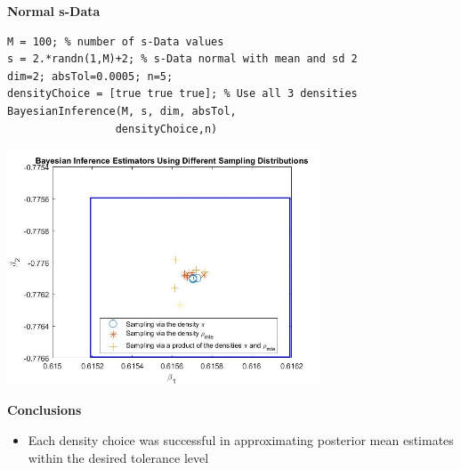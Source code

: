 \documentclass[final,mathserif]{beamer}
\newcommand{\blue}[1]{{\color{myblue}#1}}
\renewcommand{\blue}{\textcolor{blue!80!black}}
\begin{document}
\begin{frame}[fragile]
\begin{columns}[t]
\begin{column}{.31\linewidth}
\begin{block}{\Large \textbf{\blue {Normal s-Data}}}
\lstset{basicstyle=\small} 
\begin{lstlisting}      
M = 100; % number of s-Data values
s = 2.*randn(1,M)+2; % s-Data normal with mean and sd 2
dim=2; absTol=0.0005; n=5;
densityChoice = [true true true]; % Use all 3 densities
BayesianInference(M, s, dim, absTol, 
                 densityChoice,n)
\end{lstlisting}     

\vspace{.1in}

\begin{center}
\end{center}

\vspace{.1in}

\begin{center}
\includegraphics[width=0.7\textwidth]{NormalRandom}
\end{center} 

\end{block}

\bigskip

\begin{block}{\Large \textbf{\blue {Conclusions}}}

\vspace{.1in}

\begin{itemize}
\item Each density choice was successful in approximating posterior mean estimates within the desired tolerance level 


\end{itemize}
\end{block}
\end{column}
\end{columns}
\end{frame}
\end{document}
